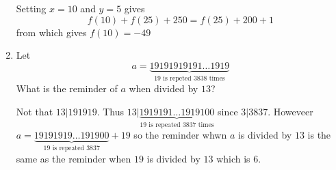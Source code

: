 \documentclass[a4paper]{article}
\theoremstyle{definition}
\begin{document}
\begin{enumerate}
\begin{tcolorbox}[width=\linewidth, sharp corners=all, colback=white!95!black]
    Setting $x = 10$ and $y= 5$ gives
    \[
        f(10) + f(25)+ 250  =f(25) + 200 +1
    \]
    from which gives $f(10) = -49$

\end{tcolorbox}
\item Let
\[
    a = \underbrace{19191919191\dots1919}_\text{19 is repeted 3838 times}
\]
What is the reminder of $a$ when divided by $13$?
\begin{tcolorbox}[width=\linewidth, sharp corners=all, colback=white!95!black]
    Not that $13 | 191919$. Thus $13 | \underbrace{1919191\dots1919100}_{19
    \text{ is repeated 3837 times} }$ since $3| 3837$.
    Howeveer $a = \underbrace{19191919 \dots 191900 }_{\text{19 is repeated 3837}}+ 19$ so the reminder
    whwn $a$ is divided by $13$
    is the same as the reminder when $19$ is divided by $13$ which is 6.
\end{tcolorbox}
\end{enumerate}
\end{document}
